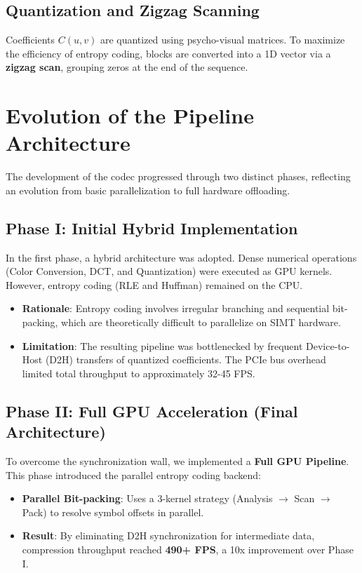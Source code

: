 \documentclass[conference]{IEEEtran}
\begin{document}
\subsection{Quantization and Zigzag Scanning}
Coefficients $C(u,v)$ are quantized using psycho-visual matrices. To maximize the efficiency of entropy coding, blocks are converted into a 1D vector via a \textbf{zigzag scan}, grouping zeros at the end of the sequence.

\section{Evolution of the Pipeline Architecture}

The development of the codec progressed through two distinct phases, reflecting an evolution from basic parallelization to full hardware offloading.

\subsection{Phase I: Initial Hybrid Implementation}
In the first phase, a hybrid architecture was adopted. Dense numerical operations (Color Conversion, DCT, and Quantization) were executed as GPU kernels. However, entropy coding (RLE and Huffman) remained on the CPU.
\begin{itemize}[leftmargin=*]
    \item \textbf{Rationale}: Entropy coding involves irregular branching and sequential bit-packing, which are theoretically difficult to parallelize on SIMT hardware.
    \item \textbf{Limitation}: The resulting pipeline was bottlenecked by frequent Device-to-Host (D2H) transfers of quantized coefficients. The PCIe bus overhead limited total throughput to approximately 32-45 FPS.
\end{itemize}

\subsection{Phase II: Full GPU Acceleration (Final Architecture)}
To overcome the synchronization wall, we implemented a \textbf{Full GPU Pipeline}. This phase introduced the parallel entropy coding backend:
\begin{itemize}[leftmargin=*]
    \item \textbf{Parallel Bit-packing}: Uses a 3-kernel strategy (Analysis $\to$ Scan $\to$ Pack) to resolve symbol offsets in parallel.
    \item \textbf{Result}: By eliminating D2H synchronization for intermediate data, compression throughput reached \textbf{490+ FPS}, a 10x improvement over Phase I.
\end{itemize}
\end{document}
